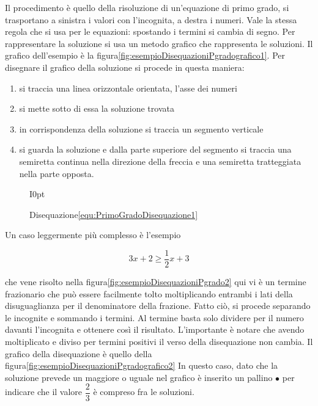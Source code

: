 Il procedimento è  quello della risoluzione di un'equazione di primo grado,  si trasportano a sinistra i valori con l'incognita,  a destra i numeri. Vale la stessa regola che si usa per le equazioni: spostando i termini si cambia di segno. Per rappresentare la soluzione si usa un metodo grafico che rappresenta le soluzioni. Il grafico dell'esempio è la figura\nobs\vref{fig:esempioDisequazioniPgradografico1}. Per disegnare il grafico della soluzione si procede in questa maniera: 
\begin{procedurat}{}{}
\begin{enumerate}
	\item si traccia una linea orizzontale orientata, l'asse dei numeri 
	\item si mette sotto di essa la soluzione trovata
	\item in corrispondenza della soluzione si traccia un segmento verticale
	\item  si guarda la soluzione e dalla parte superiore del segmento si traccia una semiretta continua nella direzione della freccia e una semiretta tratteggiata nella parte opposta.
\end{enumerate}
\end{procedurat}
\begin{figure}{I}{0pt}
	\centering
	\captionsetup{format=grafico,list=no}
	\caption[]{Disequazione\nobs\vref{equ:PrimoGradoDisequazione1}}
	\label{fig:esempioDisequazioniPgradografico1}
\end{figure}

Un caso leggermente più complesso è l'esempio
\begin{esempiot}{}{}
\begin{equation}
 3x+2\geq\dfrac{1}{2}x+3\label{equ:PrimoGradoDisequazione2}
\end{equation}
\end{esempiot}
  che vene risolto nella figura\nobs\vref{fig:esempioDisequazioniPgrado2} qui vi è un termine frazionario che può essere facilmente tolto moltiplicando entrambi i lati della disuguaglianza per il denominatore della frazione. Fatto ciò, si procede separando le incognite e sommando i termini. Al termine basta solo dividere per il numero davanti l'incognita e ottenere così il risultato. L'importante è notare che avendo moltiplicato e diviso per termini positivi il verso della disequazione non cambia. Il grafico della disequazione è quello della figura\nobs\vref{fig:esempioDisequazioniPgradografico2} In questo caso, dato che la soluzione prevede un maggiore o uguale nel grafico è inserito un pallino $\bullet$ per indicare che il valore $\dfrac{2}{3}$ è compreso fra le soluzioni.

